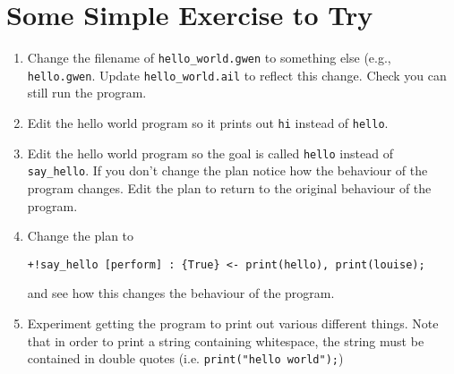 \section{Some Simple Exercise to Try}
\begin{enumerate}
\item Change the filename of \texttt{hello\_world.gwen} to something else (e.g., \texttt{hello.gwen}.  Update \texttt{hello\_world.ail} to reflect this change.  Check you can still run the program.
\item Edit the hello world program so it prints out \texttt{hi} instead of \texttt{hello}.
\item Edit the hello world program so the goal is called \texttt{hello} instead of \texttt{say\_hello}.  If you don't change the plan notice how the behaviour of the program changes.  Edit the plan to return to the original behaviour of the program.
\item Change the plan to
\begin{verbatim}
+!say_hello [perform] : {True} <- print(hello), print(louise);
\end{verbatim} and see how this changes the behaviour of the program.
\item Experiment getting the program to print out various different things.  Note that in order to print a string containing whitespace, the string must be contained in double quotes (i.e. \lstinline{print("hello world");})
\end{enumerate}

